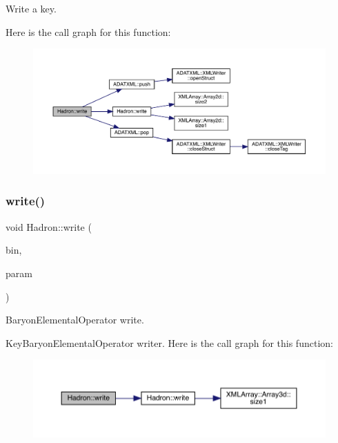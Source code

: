 Write a key. 

Here is the call graph for this function\+:
\nopagebreak
\begin{figure}[H]
\begin{center}
\leavevmode
\includegraphics[width=350pt]{d1/daf/namespaceHadron_a97758f7d26a76e70e4c61d4409eff7a6_cgraph}
\end{center}
\end{figure}
\mbox{\label{namespaceHadron_a4c0a824fa457c4fbaac034c83f5554c5}} 
\subsubsection{\texorpdfstring{write()}{write()}\hspace{0.1cm}{\footnotesize\ttfamily [44/95]}}
{\footnotesize\ttfamily void Hadron\+::write (\begin{DoxyParamCaption}\item[{\mbox{\hyperlink{classADATIO_1_1BinaryWriter}{Binary\+Writer}} \&}]{bin,  }\item[{const \mbox{\hyperlink{structHadron_1_1KeyBaryonElementalOperator__t}{Key\+Baryon\+Elemental\+Operator\+\_\+t}} \&}]{param }\end{DoxyParamCaption})}



Baryon\+Elemental\+Operator write. 

Key\+Baryon\+Elemental\+Operator writer. Here is the call graph for this function\+:
\nopagebreak
\begin{figure}[H]
\begin{center}
\leavevmode
\includegraphics[width=350pt]{d1/daf/namespaceHadron_a4c0a824fa457c4fbaac034c83f5554c5_cgraph}
\end{center}
\end{figure}
\mbox{\label{namespaceHadron_a4330be9331eb4c839e7e123f5306560b}} 
